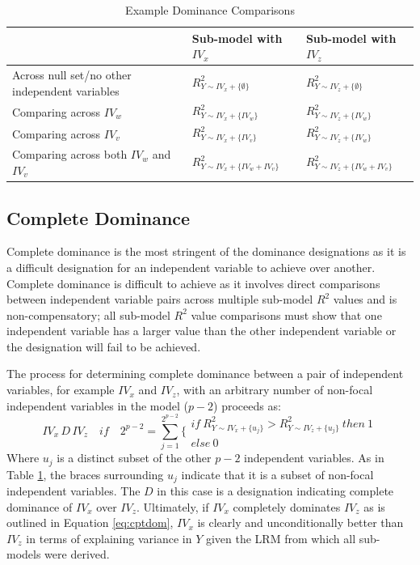 \documentclass[man]{apa7}
\begin{document}
		\begin{table}[h!]
			\centering
			\caption{\centering Example Dominance Comparisons}
			\begin{tabular}{ l | l l }
				
				& Sub-model with $IV_x$ & Sub-model with $IV_z$ \\
				\hline
				Across null set/no other independent variables & $R^2_{Y \sim IV_x + \{\emptyset\}}$ & $R^2_{Y \sim IV_z+ \{\emptyset\} }$ \\
				Comparing across $IV_w$ & $R^2_{Y \sim IV_x + \{IV_w\}}$ & $R^2_{Y \sim IV_z + \{IV_w\}}$ \\
				Comparing across $IV_v$ & $R^2_{Y \sim IV_x + \{IV_v\}}$ & $R^2_{Y \sim IV_z + \{IV_w\}}$ \\
				Comparing across both $IV_w$ and $IV_v$ & $R^2_{Y \sim IV_x + \{IV_w + IV_v\}}$ & $R^2_{Y \sim IV_z + \{IV_w + IV_v\}}$ \\
				\hline
		\end{tabular}
		\label{tab:exdom}
	\end{table}
	
	\subsection{Complete Dominance}
	
	Complete dominance is the most stringent of the dominance designations as it is a difficult designation for an independent variable to achieve over another.
	Complete dominance is difficult to achieve as it involves direct comparisons between independent variable pairs across multiple sub-model $R^2$ values and is non-compensatory; all sub-model $R^2$ value comparisons must show that one independent variable has a larger value than the other independent variable or the designation will fail to be achieved.
	
	The process for determining complete dominance between a pair of independent variables, for example $IV_x$ and $IV_z$, with an arbitrary number of non-focal independent variables in the model ($p - 2$) proceeds as:
	\begin{equation}
		IV_x \, D \, IV_z \quad if \quad 2^{p-2} = \sum^{2^{p-2}}_{j=1} \Biggr\{ 
		\begin{array}{l}
			if \ R^2_{Y \sim IV_x + \{u_j\}} > R^2_{Y \sim IV_z + \{u_j\}} \ then \ 1 \\
			else \ 0 
		\end{array}
		\label{eq:cptdom}
	\end{equation}
	Where $u_j$ is a distinct subset of the other $p - 2$ independent variables.
	As in Table \ref{tab:exdom}, the braces surrounding $u_j$ indicate that it is a subset of non-focal independent variables.
	The $D$ in this case is a designation indicating complete dominance of $IV_x$ over $IV_z$.
	Ultimately, if $IV_x$ completely dominates $IV_z$ as is outlined in Equation \ref{eq:cptdom}, $IV_x$ is clearly and unconditionally better than $IV_z$ in terms of explaining variance in $Y$ given the LRM from which all sub-models were derived.	
	
\end{document}
